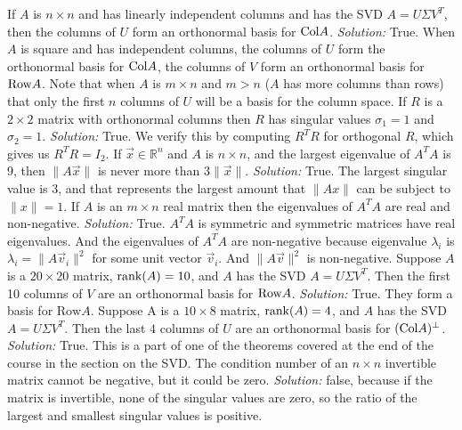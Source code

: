 \fi     
\ifnum {}
    If $A$ is $n\times n$ and has linearly independent columns and has the SVD $A = U\Sigma V^T$, then the columns of $U$ form an orthonormal basis for $\text{Col} A$.
    \ifnum {} {\color{DarkBlue} \textit{Solution:  } True. When $A$ is square and has independent columns, the columns of $U$ form the orthonormal basis for $\text{Col} A$, the columns of $V$ form an orthonormal basis for $\text{Row} A$. Note that when $A$ is $m\times n$ and $m>n$ ($A$ has more columns than rows) that only the first $n$ columns of $U$ will be a basis for the column space.  }\fi
\fi     
\ifnum {}
  If $R$ is a $2\times2$ matrix with orthonormal columns then $R$ has singular values $\sigma_1 = 1$ and $\sigma_2 = 1$.
    \ifnum {} {\color{DarkBlue} \textit{Solution:  } True. We verify this by computing $R^TR$ for orthogonal $R$, which gives us $R^TR = I_2$.  } \fi
\fi     
\ifnum {}
   If $\vec x \in \mathbb R^n$ and $A$ is $n\times n$, and the largest eigenvalue  of $A^TA$ is 9, then $\|A\vec x\|$ is never more than $3 \|\vec x\|$. 
    \ifnum {} {\color{DarkBlue} \textit{Solution:  } True. 
    The largest singular value is 3, and that represents the largest amount that $\| Ax \|$ can be subject to $\| x\|=1$.} \fi
\fi     
\ifnum {}
    If $A$ is an $m\times n$ real matrix then the eigenvalues of $A^TA$ are real and non-negative.  
    \ifnum {} {\color{DarkBlue} \textit{Solution:} True. $A^TA$ is symmetric and symmetric matrices have real eigenvalues. And the eigenvalues of $A^TA$ are non-negative because eigenvalue $\lambda_i$ is $\lambda_i = \|A\vec v_i\|^2$ for some unit vector $\vec v_i$. And $\|A\vec v\|^2$  is non-negative.   } \fi
\fi     
\ifnum {}
       Suppose $A$ is a $20 \times 20$ matrix, $\text{rank}(A)=10$, and $A$ has the SVD $A = U\Sigma V^T$. Then the first 10 columns of $V$ are an orthonormal basis for $\text{Row} A$. 
    \ifnum {} {\color{DarkBlue} \textit{Solution:  } True. They form a basis for $\text{Row} A$. } \fi
\fi   
\ifnum {} %
    Suppose A is a $10 \times 8$ matrix, $\text{rank}(A)=4$, and $A$ has the SVD $A = U\Sigma V^T$. Then the last $4$ columns of $U$ are an orthonormal basis for $(\text{Col} A)^{\perp}$. 
    \ifnum {} {\color{DarkBlue} \textit{Solution:  } True. This is a part of one of the theorems covered at the end of the course in the section on the SVD.} \fi
\fi     
\ifnum {} %
    The condition number of an $n\times n$ invertible matrix cannot be negative, but it could be zero. 
    \ifnum {} {\color{DarkBlue} \textit{Solution:  } false, because if the matrix is invertible, none of the singular values are zero, so the ratio of the largest and smallest singular values is positive. } \fi
